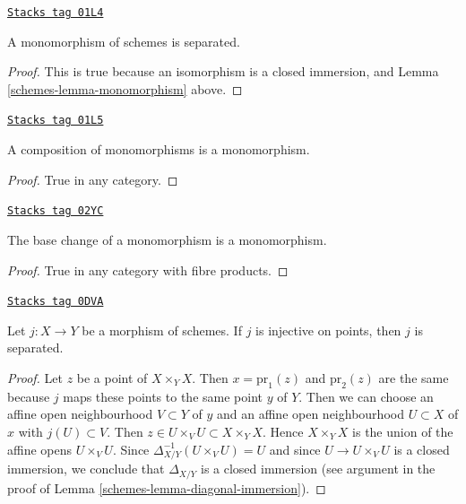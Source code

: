 \begin{lemma}
\label{schemes-lemma-monomorphism-separated}
\href{https://stacks.math.columbia.edu/tag/01L4}{\texttt{Stacks tag 01L4}}

A monomorphism of schemes is separated.
\end{lemma}

\begin{proof}

This is true because an isomorphism is a closed immersion,
and Lemma \ref{schemes-lemma-monomorphism} above.
\end{proof}

\begin{lemma}
\label{schemes-lemma-composition-monomorphism}
\href{https://stacks.math.columbia.edu/tag/01L5}{\texttt{Stacks tag 01L5}}

A composition of monomorphisms is a monomorphism.
\end{lemma}

\begin{proof}
True in any category.
\end{proof}

\begin{lemma}
\label{schemes-lemma-base-change-monomorphism}
\href{https://stacks.math.columbia.edu/tag/02YC}{\texttt{Stacks tag 02YC}}

The base change of a monomorphism is a monomorphism.
\end{lemma}

\begin{proof}
True in any category with fibre products.
\end{proof}

\begin{lemma}
\label{schemes-lemma-injective-points}
\href{https://stacks.math.columbia.edu/tag/0DVA}{\texttt{Stacks tag 0DVA}}

Let $j : X \to Y$ be a morphism of schemes.
If $j$ is injective on points, then $j$ is separated.
\end{lemma}

\begin{proof}

Let $z$ be a point of $X \times_Y X$. Then $x = \text{pr}_1(z)$ and
$\text{pr}_2(z)$ are the same because $j$ maps these points to
the same point $y$ of $Y$. Then we can choose an affine
open neighbourhood $V \subset Y$ of $y$ and an affine open
neighbourhood $U \subset X$ of $x$ with $j(U) \subset V$.
Then $z \in U \times_V U \subset X \times_Y X$.
Hence $X \times_Y X$ is the union of the affine
opens $U \times_V U$. Since $\Delta_{X/Y}^{-1}(U \times_V U) = U$
and since $U \to U \times_V U$ is a closed immersion, we conclude
that $\Delta_{X/Y}$ is a closed immersion (see argument in the
proof of Lemma \ref{schemes-lemma-diagonal-immersion}).
\end{proof}


